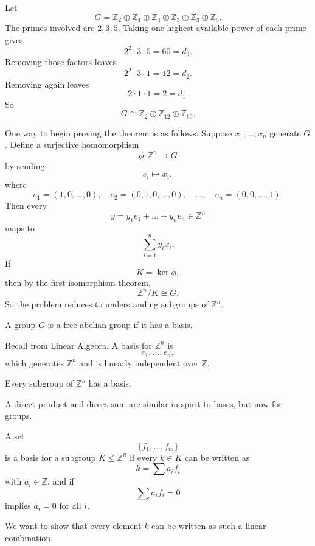 \begin{example}
Let
\[
G=\mathbb{Z}_2\oplus \mathbb{Z}_4\oplus \mathbb{Z}_4\oplus \mathbb{Z}_3\oplus \mathbb{Z}_3\oplus \mathbb{Z}_5.
\]
The primes involved are $2,3,5$.
Taking one highest available power of each prime gives
\[
2^2\cdot 3\cdot 5=60=d_3.
\]
Removing those factors leaves
\[
2^2\cdot 3\cdot 1=12=d_2.
\]
Removing again leaves
\[
2\cdot 1\cdot 1=2=d_1.
\]
So
\[
G\cong \mathbb{Z}_2\oplus \mathbb{Z}_{12}\oplus \mathbb{Z}_{60}.
\]
\end{example}

\begin{remark}
One way to begin proving the theorem is as follows.
Suppose $x_1,\dots,x_n$ generate $G$.
Define a surjective homomorphism
\[
\phi:\mathbb{Z}^n\to G
\]
by sending
\[
e_i\mapsto x_i,
\]
where
\[
e_1=(1,0,\dots,0),\quad e_2=(0,1,0,\dots,0),\quad \dots,\quad e_n=(0,0,\dots,1).
\]
Then every
\[
y=y_1e_1+\dots+y_ne_n\in \mathbb{Z}^n
\]
maps to
\[
\sum_{i=1}^n y_ix_i.
\]
If
\[
K=\ker\phi,
\]
then by the first isomorphism theorem,
\[
\mathbb{Z}^n/K\cong G.
\]
So the problem reduces to understanding subgroups of $\mathbb{Z}^n$.
\end{remark}

\begin{definition}
A group $G$ is a free abelian group if it has a basis.
\end{definition}

\begin{remark}
Recall from Linear Algebra.
A basis for $\mathbb{Z}^n$ is
\[
e_1,\dots,e_n,
\]
which generates $\mathbb{Z}^n$ and is linearly independent over $\mathbb{Z}$.
\end{remark}

\begin{lemma*}{
Every subgroup of $\mathbb{Z}^n$ has a basis.
}
\end{lemma*}

A direct product and direct sum are similar in spirit to bases, but now for groups.

\begin{theorem*}{
A set
\[
\{f_1,\ldots,f_m\}
\]
is a basis for a subgroup $K\leq \mathbb{Z}^n$ if every $k\in K$ can be written as
\[
k=\sum a_if_i
\]
with $a_i\in \mathbb{Z}$, and if
\[
\sum a_if_i=0
\]
implies $a_i=0$ for all $i$.
}
\end{theorem*}

We want to show that every element $k$ can be written as such a linear combination.


